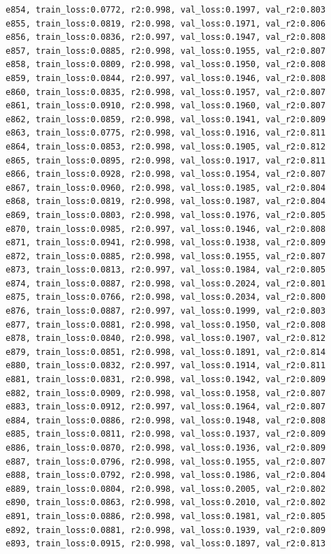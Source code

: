 \documentclass[a4paper, 12pt]{article}
\begin{document}
\begin{lstlisting}
e854, train_loss:0.0772, r2:0.998, val_loss:0.1997, val_r2:0.803
e855, train_loss:0.0819, r2:0.998, val_loss:0.1971, val_r2:0.806
e856, train_loss:0.0836, r2:0.997, val_loss:0.1947, val_r2:0.808
e857, train_loss:0.0885, r2:0.998, val_loss:0.1955, val_r2:0.807
e858, train_loss:0.0809, r2:0.998, val_loss:0.1950, val_r2:0.808
e859, train_loss:0.0844, r2:0.997, val_loss:0.1946, val_r2:0.808
e860, train_loss:0.0835, r2:0.998, val_loss:0.1957, val_r2:0.807
e861, train_loss:0.0910, r2:0.998, val_loss:0.1960, val_r2:0.807
e862, train_loss:0.0859, r2:0.998, val_loss:0.1941, val_r2:0.809
e863, train_loss:0.0775, r2:0.998, val_loss:0.1916, val_r2:0.811
e864, train_loss:0.0853, r2:0.998, val_loss:0.1905, val_r2:0.812
e865, train_loss:0.0895, r2:0.998, val_loss:0.1917, val_r2:0.811
e866, train_loss:0.0928, r2:0.998, val_loss:0.1954, val_r2:0.807
e867, train_loss:0.0960, r2:0.998, val_loss:0.1985, val_r2:0.804
e868, train_loss:0.0819, r2:0.998, val_loss:0.1987, val_r2:0.804
e869, train_loss:0.0803, r2:0.998, val_loss:0.1976, val_r2:0.805
e870, train_loss:0.0985, r2:0.997, val_loss:0.1946, val_r2:0.808
e871, train_loss:0.0941, r2:0.998, val_loss:0.1938, val_r2:0.809
e872, train_loss:0.0885, r2:0.998, val_loss:0.1955, val_r2:0.807
e873, train_loss:0.0813, r2:0.997, val_loss:0.1984, val_r2:0.805
e874, train_loss:0.0887, r2:0.998, val_loss:0.2024, val_r2:0.801
e875, train_loss:0.0766, r2:0.998, val_loss:0.2034, val_r2:0.800
e876, train_loss:0.0887, r2:0.997, val_loss:0.1999, val_r2:0.803
e877, train_loss:0.0881, r2:0.998, val_loss:0.1950, val_r2:0.808
e878, train_loss:0.0840, r2:0.998, val_loss:0.1907, val_r2:0.812
e879, train_loss:0.0851, r2:0.998, val_loss:0.1891, val_r2:0.814
e880, train_loss:0.0832, r2:0.997, val_loss:0.1914, val_r2:0.811
e881, train_loss:0.0831, r2:0.998, val_loss:0.1942, val_r2:0.809
e882, train_loss:0.0909, r2:0.998, val_loss:0.1958, val_r2:0.807
e883, train_loss:0.0912, r2:0.997, val_loss:0.1964, val_r2:0.807
e884, train_loss:0.0886, r2:0.998, val_loss:0.1948, val_r2:0.808
e885, train_loss:0.0811, r2:0.998, val_loss:0.1937, val_r2:0.809
e886, train_loss:0.0870, r2:0.998, val_loss:0.1936, val_r2:0.809
e887, train_loss:0.0796, r2:0.998, val_loss:0.1955, val_r2:0.807
e888, train_loss:0.0792, r2:0.998, val_loss:0.1986, val_r2:0.804
e889, train_loss:0.0804, r2:0.998, val_loss:0.2005, val_r2:0.802
e890, train_loss:0.0863, r2:0.998, val_loss:0.2010, val_r2:0.802
e891, train_loss:0.0886, r2:0.998, val_loss:0.1981, val_r2:0.805
e892, train_loss:0.0881, r2:0.998, val_loss:0.1939, val_r2:0.809
e893, train_loss:0.0915, r2:0.998, val_loss:0.1897, val_r2:0.813

\end{lstlisting}
\end{document}
